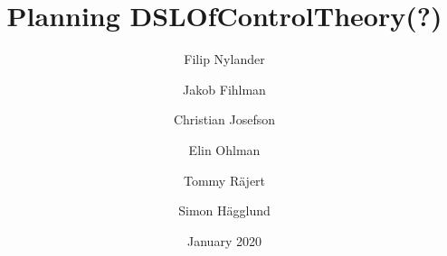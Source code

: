 \documentclass{article}
\title{Planning DSLOfControlTheory(?)}
\author{
    Filip Nylander \and 
    Jakob Fihlman \and 
    Christian Josefson \and 
    Elin Ohlman \and 
    Tommy Räjert \and 
    Simon Hägglund
    }
\date{January 2020}
\begin{document}
\maketitle











\newpage
\medskip
\printbibliography
\end{document}
